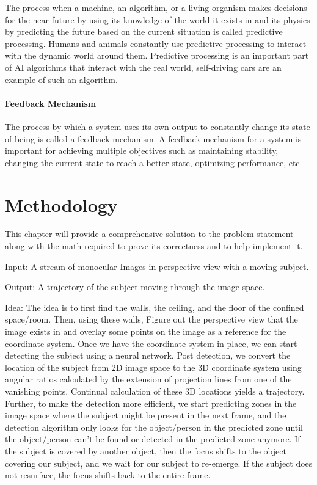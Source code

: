 \documentclass[12pt]{report}
\begin{document}
The process when a machine, an algorithm, or a living organism makes decisions for the near future by using its knowledge of the world it exists in and its physics by predicting the future based on the current situation is called predictive processing. Humans and animals constantly use predictive processing to interact with the dynamic world around them. Predictive processing is an important part of AI algorithms that interact with the real world, self-driving cars are an example of such an algorithm.

\subsubsection{Feedback Mechanism}

The process by which a system uses its own output to constantly change its state of being is called a feedback mechanism. A feedback mechanism for a system is important for achieving multiple objectives such as maintaining stability, changing the current state to reach a better state, optimizing performance, etc.



\chapter{Methodology}

This chapter will provide a comprehensive solution to the problem statement along with the math required to prove its correctness and to help implement it.\newline

Input: A stream of monocular Images in perspective view with a moving subject.\newline

Output: A trajectory of the subject moving through the image space.\newline

Idea: The idea is to first find the walls, the ceiling, and the floor of the confined space/room. Then, using these walls, Figure out the perspective view that the image exists in and overlay some points on the image as a reference for the coordinate system. Once we have the coordinate system in place, we can start detecting the subject using a neural network. Post detection, we convert the location of the subject from 2D image space to the 3D coordinate system using angular ratios calculated by the extension of projection lines from one of the vanishing points. Continual calculation of these 3D locations yields a trajectory. Further, to make the detection more efficient, we start predicting zones in the image space where the subject might be present in the next frame, and the detection algorithm only looks for the object/person in the predicted zone until the object/person can’t be found or detected in the predicted zone anymore. If the subject is covered by another object, then the focus shifts to the object covering our subject, and we wait for our subject to re-emerge. If the subject does not resurface, the focus shifts back to the entire frame.\newline
\end{document}
